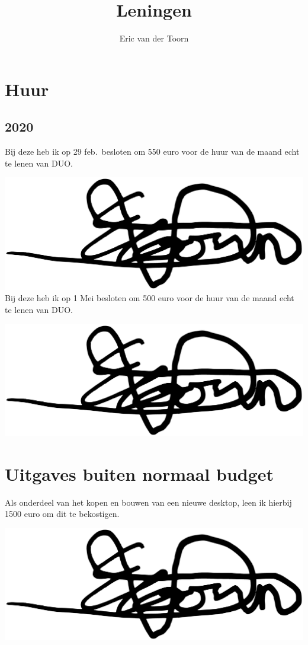 \documentclass[12pt,a4paper]{article}
\title{Leningen}
\author{Eric van der Toorn}
\newcommand{\sign}{\par \includegraphics[height=2\baselineskip]{sig}}
\begin{document}
\maketitle

\section{Huur}
\subsection{2020}
Bij deze heb ik op 29 feb.\ besloten om 550 euro voor de huur van de maand echt te lenen van DUO.
\sign
\\
Bij deze heb ik op 1 Mei besloten om 500 euro voor de huur van de maand echt te lenen van DUO.
\sign%

\section{Uitgaves buiten normaal budget}

Als onderdeel van het kopen en bouwen van een nieuwe desktop, leen ik hierbij 1500 euro om dit te bekostigen.

\sign%
\end{document}
